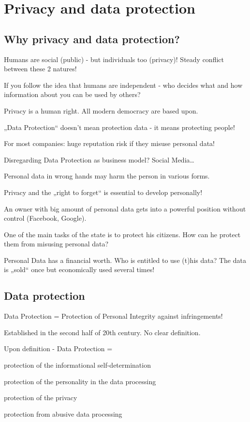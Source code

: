\section{Privacy and data protection}
\subsection{Why privacy and data protection?}
\begin{compactitem}
	\item Humans are social (public) - but individuals too (privacy)! Steady conflict between these	2 natures!
	\item If you follow the idea that humans are independent - who decides what and how	information about you can be used by others?
	\item Privacy is a human right. All modern democracy are based upon.
	\item „Data Protection“ doesn’t mean protection data - it means protecting people!
	\item For most companies: huge reputation risk if they misuse personal data!
	\item Disregarding Data Protection as business model? Social Media…
	\item Personal data in wrong hands may harm the person in various forms.
	\item Privacy and the „right to forget“ is essential to develop personally!
	\item An owner with big amount of personal data gets into a powerful position without control (Facebook, Google).
	\item One of the main tasks of the state is to protect his citizens. How can he protect them from misusing personal data?
	\item Personal Data has a financial worth. Who is entitled to use (t)his data? The data is „sold“ once but economically used several times!
\end{compactitem}

\subsection{Data protection}
\begin{compactitem}
	\item Data Protection = Protection of Personal Integrity against infringements!
	\item Established in the second half of 20th century. No clear definition.
	\item Upon definition - Data Protection =
	\begin{compactitem}
		\item protection of the informational self-determination
		\item protection of the personality in the data processing
		\item protection of the privacy
		\item protection from abusive data processing
	\end{compactitem}
\end{compactitem}

